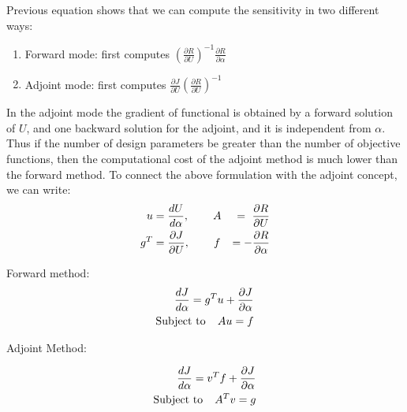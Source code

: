 \documentclass[a4paper,10pt]{article}
\begin{document}
   Previous equation shows that we can compute the sensitivity in two different ways:
   \begin{enumerate}
    \item Forward mode: first computes $(\frac{\partial R}{\partial U})^{-1} \frac{\partial R}{\partial \alpha}$
    \item Adjoint mode: first computes $\frac{\partial J}{\partial U} (\frac{\partial R}{\partial U})^{-1}$
   \end{enumerate}
     In the adjoint mode the gradient of functional is obtained by a forward solution of $U$, and one backward solution for 
     the adjoint, and it is independent from $\alpha$. Thus if the number of design parameters be greater than the number of 
     objective functions, then the computational cost of the adjoint method is much lower than the forward method.   
To connect the above formulation with the adjoint concept, we can write:
   \begin{equation}
    \begin{aligned}
  u&= \frac{d U}{d \alpha}, \hspace{.3 in} A&=\ \frac{\partial R}{\partial U} 
 \\ g^T&= \frac{\partial J}{\partial U},  \hspace{.3 in} f&=-\frac{\partial R}{\partial \alpha}
 \end{aligned}
   \end{equation}

   Forward method:
   \begin{equation}
   \label{disadj1}
      \begin{aligned}
  \frac{dJ}{d \alpha} = g^T u + \frac{\partial J}{\partial \alpha} \\
   \text{Subject to} \hspace{.15 in} Au = f
     \end{aligned}
  \end{equation}



  Adjoint Method:
  
  \begin{equation}
   \label{disadj2}
      \begin{aligned}
  \frac{dJ}{d \alpha} = v^T f + \frac{\partial J}{\partial \alpha} \\
   \text{Subject to} \hspace{.15 in} A^T v = g
     \end{aligned}
 \end{equation}
\end{document}
